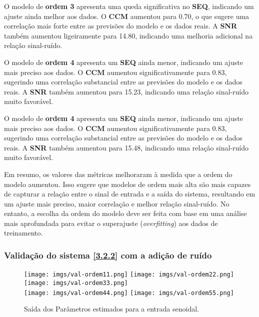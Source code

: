\documentclass[a4paper,12pt]{article}
\begin{document}
O modelo de \textbf{ordem 3} apresenta uma queda significativa no \textbf{SEQ}, indicando um ajuste ainda melhor aos dados. O \textbf{CCM} aumentou para 0.70, o que sugere uma correlação mais forte entre as previsões do modelo e os dados reais. A \textbf{SNR} também aumentou ligeiramente para 14.80, indicando uma melhoria adicional na relação sinal-ruído.

O modelo de \textbf{ordem 4} apresenta um \textbf{SEQ} ainda menor, indicando um ajuste mais preciso aos dados. O \textbf{CCM} aumentou significativamente para 0.83, sugerindo uma correlação substancial entre as previsões do modelo e os dados reais. A \textbf{SNR} também aumentou para 15.23, indicando uma relação sinal-ruído muito favorável.

O modelo de \textbf{ordem 4} apresenta um \textbf{SEQ} ainda menor, indicando um ajuste mais preciso aos dados. O \textbf{CCM} aumentou significativamente para 0.83, sugerindo uma correlação substancial entre as previsões do modelo e os dados reais. A \textbf{SNR} também aumentou para 15.48, indicando uma relação sinal-ruído muito favorável.

Em resumo, os valores das métricas melhoraram à medida que a ordem do modelo aumentou. Isso sugere que modelos de ordem mais alta são mais capazes de capturar a relação entre o sinal de entrada e a saída do sistema, resultando em um ajuste mais preciso, maior correlação e melhor relação sinal-ruído. No entanto, a escolha da ordem do modelo deve ser feita com base em uma análise mais aprofundada para evitar o superajuste (\textit{overfitting}) aos dados de treinamento. 
\newpage
\subsubsection{Validação do sistema \ref{3.2.2} com a adição de ruído}

\begin{figure}[h!]
\centering

\texttt{[image: imgs/val-ordem11.png]} \quad
\texttt{[image: imgs/val-ordem22.png]} \quad
\texttt{[image: imgs/val-ordem33.png]} \\

\texttt{[image: imgs/val-ordem44.png]} \quad
\texttt{[image: imgs/val-ordem55.png]}

\caption{Saída dos Parâmetros estimados para a entrada senoidal.} \label{fig6}
\end{figure}
\end{document}
